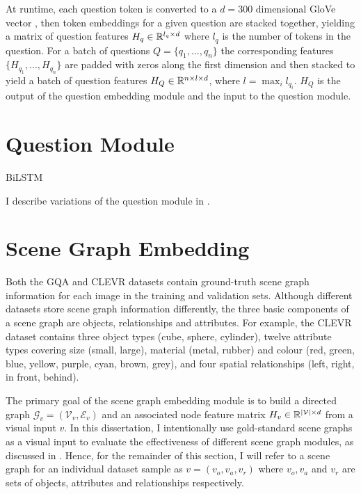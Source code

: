 At runtime, each question token is converted to a \(d = 300\) dimensional GloVe vector \cite{pennington2014glove}, then token embeddings for a given question are stacked together, yielding a matrix of question features \(H_q \in \mathbb{R}^{l_q \times d}\) where \(l_q\) is the number of tokens in the question. For a batch of questions \(Q = \{q_1, ..., q_n\}\) the corresponding features \(\{H_{q_1}, ..., H_{q_n}\}\) are padded with zeros along the first dimension and then stacked to yield a batch of question features \(H_Q \in \mathbb{R}^{n \times l \times d}\), where \(l = \max_{i} l_{q_i}\). \(H_Q\) is the output of the question embedding module and the input to the question module.

\section{Question Module}
\label{section:question_module}

BiLSTM \cite{hochreiter1997long}

I describe variations of the question module in \sectionautorefname{ \ref{sec:ablation_studies}}.


\section{Scene Graph Embedding}
\label{section:scene_graph_embedding}

Both the GQA and CLEVR datasets contain ground-truth scene graph information for each image in the training and validation sets. Although different datasets store scene graph information differently, the three basic components of a scene graph are objects, relationships and attributes. For example, the CLEVR dataset contains three object types (cube, sphere, cylinder), twelve attribute types covering size (small, large), material (metal, rubber) and colour (red, green, blue, yellow, purple, cyan, brown, grey), and four spatial relationships (left, right, in front, behind).
 
The primary goal of the scene graph embedding module is to build a directed graph \(\mathcal{G}_v = (\mathcal{V}_v, \mathcal{E}_v)\) and an associated node feature matrix \(H_v \in \mathbb{R}^{|\mathcal{V}| \times d}\) from a visual input \(v\). In this dissertation, I intentionally use gold-standard scene graphs as a visual input to evaluate the effectiveness of different scene graph modules, as discussed in \sectionautorefname{ \ref{sec:ablation_studies}}. Hence, for the remainder of this section, I will refer to a scene graph for an individual dataset sample as \(v = (v_o, v_a, v_r)\) where \(v_o, v_a\) and \(v_r\) are sets of objects, attributes and relationships respectively.

